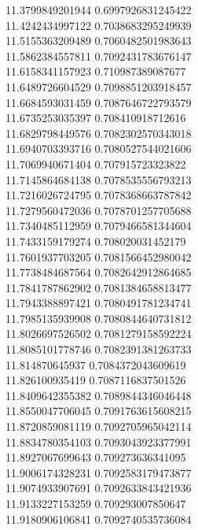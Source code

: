 {11.3799849201944 0.6997926831245422 \\
11.4242434997122 0.7038683295249939 \\
11.5155363209489 0.7060482501983643 \\
11.5862384557811 0.7092431783676147 \\
11.6158341157923 0.710987389087677 \\
11.6489726604529 0.7098851203918457 \\
11.6684593031459 0.7087646722793579 \\
11.6735253035397 0.708410918712616 \\
11.6829798449576 0.7082302570343018 \\
11.6940703393716 0.7080527544021606 \\
11.7069940671404 0.707915723323822 \\
11.7145864684138 0.7078535556793213 \\
11.7216026724795 0.7078368663787842 \\
11.7279560472036 0.7078701257705688 \\
11.7340485112959 0.7079466581344604 \\
11.7433159179274 0.708020031452179 \\
11.7601937703205 0.7081566452980042 \\
11.7738484687564 0.7082642912864685 \\
11.7841787862902 0.7081384658813477 \\
11.7943388897421 0.7080491781234741 \\
11.7985135939908 0.7080844640731812 \\
11.8026697526502 0.7081279158592224 \\
11.8085101778746 0.7082391381263733 \\
11.814870645937 0.7084372043609619 \\
11.826100935419 0.7087116837501526 \\
11.8409642355382 0.7089844346046448 \\
11.8550047706045 0.7091763615608215 \\
11.8720859081119 0.7092705965042114 \\
11.8834780354103 0.7093043923377991 \\
11.8927067699643 0.709273636341095 \\
11.9006174328231 0.7092583179473877 \\
11.9074933907691 0.7092633843421936 \\
11.9133227153259 0.709293007850647 \\
11.9180906106841 0.7092740535736084 \\
}
